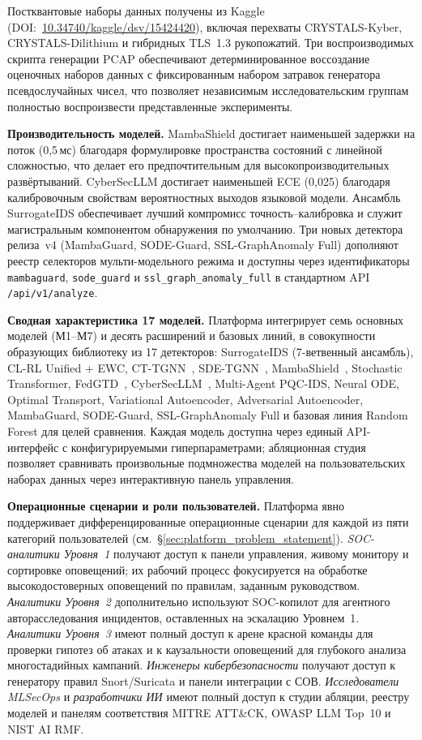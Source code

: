 Постквантовые наборы данных получены из Kaggle (DOI:~\url{10.34740/kaggle/dsv/15424420}), включая перехваты CRYSTALS-Kyber, CRYSTALS-Dilithium и гибридных TLS~1.3 рукопожатий. Три воспроизводимых скрипта генерации PCAP обеспечивают детерминированное воссоздание оценочных наборов данных с фиксированным набором затравок генератора псевдослучайных чисел, что позволяет независимым исследовательским группам полностью воспроизвести представленные эксперименты.

\noindent\textbf{Производительность моделей.} MambaShield достигает наименьшей задержки на поток (0,5\,мс) благодаря формулировке пространства состояний с линейной сложностью, что делает его предпочтительным для высокопроизводительных развёртываний. CyberSecLLM достигает наименьшей ECE (0,025) благодаря калибровочным свойствам вероятностных выходов языковой модели. Ансамбль SurrogateIDS обеспечивает лучший компромисс точность--калибровка и служит магистральным компонентом обнаружения по умолчанию. Три новых детектора релиза~v4 (MambaGuard, SODE-Guard, SSL-GraphAnomaly Full) дополняют реестр селекторов мульти-модельного режима и доступны через идентификаторы \texttt{mambaguard}, \texttt{sode\_guard} и \texttt{ssl\_graph\_anomaly\_full} в стандартном API \texttt{/api/v1/analyze}.

\noindent\textbf{Сводная характеристика 17 моделей.} Платформа интегрирует семь основных моделей (М1--М7) и десять расширений и базовых линий, в совокупности образующих библиотеку из 17 детекторов: SurrogateIDS (7-ветвенный ансамбль), CL-RL Unified + EWC, CT-TGNN~\cite{Anaedevha2025cais}, SDE-TGNN~\cite{Anaedevha2026sdetgnn}, MambaShield~\cite{Anaedevha2026mamba}, Stochastic Transformer, FedGTD~\cite{Anaedevha2026neurips}, CyberSecLLM~\cite{Anaedevha2026cybersecllm}, Multi-Agent PQC-IDS, Neural ODE, Optimal Transport, Variational Autoencoder, Adversarial Autoencoder, MambaGuard, SODE-Guard, SSL-GraphAnomaly Full и базовая линия Random Forest для целей сравнения. Каждая модель доступна через единый API-интерфейс с конфигурируемыми гиперпараметрами; абляционная студия позволяет сравнивать произвольные подмножества моделей на пользовательских наборах данных через интерактивную панель управления.

\noindent\textbf{Операционные сценарии и роли пользователей.} Платформа явно поддерживает дифференцированные операционные сценарии для каждой из пяти категорий пользователей (см.\ \S\ref{sec:platform_problem_statement}). \emph{SOC-аналитики Уровня~1} получают доступ к панели управления, живому монитору и сортировке оповещений; их рабочий процесс фокусируется на обработке высокодостоверных оповещений по правилам, заданным руководством. \emph{Аналитики Уровня~2} дополнительно используют SOC-копилот для агентного авторасследования инцидентов, оставленных на эскалацию Уровнем~1. \emph{Аналитики Уровня~3} имеют полный доступ к арене красной команды для проверки гипотез об атаках и к каузальности оповещений для глубокого анализа многостадийных кампаний. \emph{Инженеры кибербезопасности} получают доступ к генератору правил Snort/Suricata и панели интеграции с СОВ. \emph{Исследователи MLSecOps} и \emph{разработчики ИИ} имеют полный доступ к студии абляции, реестру моделей и панелям соответствия MITRE ATT\&CK, OWASP LLM Top~10 и NIST AI RMF.

